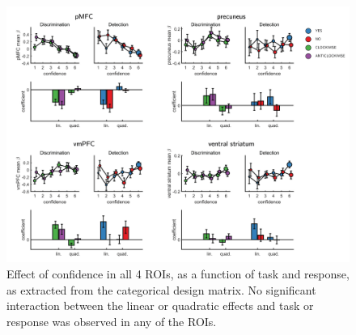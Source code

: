 \documentclass[12pt,twoside]{reedthesis}
\begin{document}
\begin{figure}[H]
\includegraphics[width=\linewidth]{figure/fMRI/allROIs} \caption[Effect of confidence in Regions of Interest]{Effect of confidence in all 4 ROIs, as a function of task and response, as extracted from the categorical design matrix. No significant interaction between the linear or quadratic effects and task or response was observed in any of the ROIs.}\label{fig:ROIconf}
\end{figure}
\newpage
\end{document}
